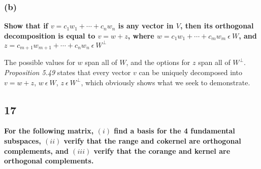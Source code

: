 \documentclass[10pt,letterpaper]{article}
\begin{document}
	\subsubsection*{(b)} \textbf{Show that if $v = c_1w_1 + \cdots + c_nw_n$ is any vector in $V$, then its orthogonal decomposition is equal to $v = w+z$, where $w = c_1w_1 + \cdots + c_mw_m \: \epsilon \: W$, and $z = c_{m+1}w_{m+1}+\cdots + c_nw_n \: \epsilon \: W^\perp$}
	
	The possible values for $w$ span all of $W$, and the options for $z$ span all of $W^\perp$. \textit{Proposition 5.49} states that every vector $v$ can be uniquely decomposed into $v = w + z$, $w \: \epsilon \: W$, $z \: \epsilon \: W^\perp$, which obviously shows what we seek to demonstrate. 
	 
	\subsection*{17} \textbf{For the following matrix, $(i)$ find a basis for the 4 fundamental subspaces, $(ii)$ verify that the range and cokernel are orthogonal complements, and $(iii)$ verify that the corange and kernel are orthogonal complements. }
\end{document}
